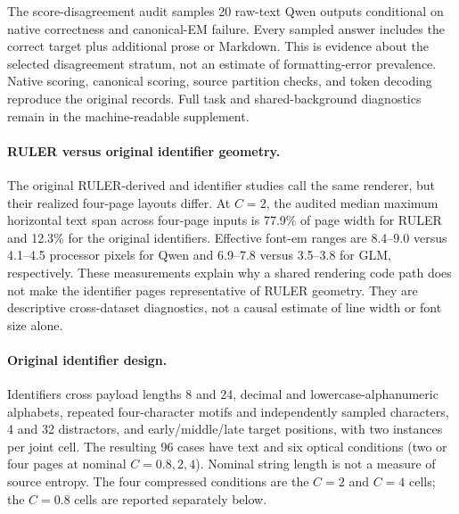\begin{table}[ht]\centering\small
\caption{Complete task-level RULER-derived native scores (percent). MK3: multikey 3; MV: multivalue; S1--S3: single 1--3; VT: variable tracking. The optical conditions all use four pages.}

\end{table}

\begin{table}[ht]\centering\footnotesize
\caption{Native RULER accounting from preserved per-case records. Entries are marginal medians across 180 cases per condition; they need not add or divide to the median of another column. $S=N_M(X)$, $V$ is vision tokens, $H=T-V$ is nonvision input, and $T$ is total input. Density is median per-case $S/V$, with its observed range.}
\label{tab:ratesfull}
\end{table}

The score-disagreement audit samples 20 raw-text Qwen outputs conditional on native correctness and canonical-EM failure. Every sampled answer includes the correct target plus additional prose or Markdown. This is evidence about the selected disagreement stratum, not an estimate of formatting-error prevalence. Native scoring, canonical scoring, source partition checks, and token decoding reproduce the original records. Full task and shared-background diagnostics remain in the machine-readable supplement.

\paragraph{RULER versus original identifier geometry.}
The original RULER-derived and identifier studies call the same renderer, but their realized four-page layouts differ. At $C=2$, the audited median maximum horizontal text span across four-page inputs is 77.9\% of page width for RULER and 12.3\% for the original identifiers. Effective font-em ranges are 8.4--9.0 versus 4.1--4.5 processor pixels for Qwen and 6.9--7.8 versus 3.5--3.8 for GLM, respectively. These measurements explain why a shared rendering code path does not make the identifier pages representative of RULER geometry. They are descriptive cross-dataset diagnostics, not a causal estimate of line width or font size alone.

\paragraph{Original identifier design.}
Identifiers cross payload lengths 8 and 24, decimal and lowercase-alphanumeric alphabets, repeated four-character motifs and independently sampled characters, 4 and 32 distractors, and early/middle/late target positions, with two instances per joint cell. The resulting 96 cases have text and six optical conditions (two or four pages at nominal $C=0.8,2,4$). Nominal string length is not a measure of source entropy. The four compressed conditions are the $C=2$ and $C=4$ cells; the $C=0.8$ cells are reported separately below.

